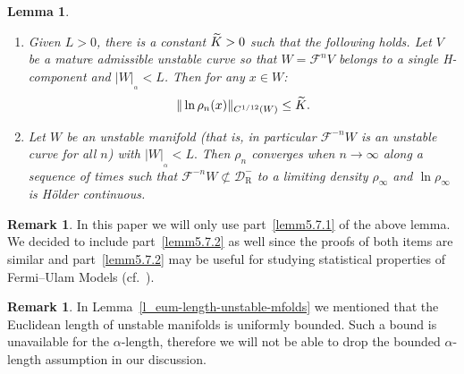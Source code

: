 \documentclass[10pt]{amsart}
\newtheorem{lemm}[theo]{Lemma}\newtheorem{prop}[theo]{Proposition}\newtheorem{coro}[theo]{Corollary}\newtheorem{conj}[theo]{Conjecture}
\theoremstyle{definition}\newtheorem{defi}[theo]{Definition}\newtheorem{rema}[theo]{Remark}\newtheorem{exam}[theo]{Example}\newtheorem{exem}[theo]{Example}\newtheorem{nota}[theo]{Notation}
\newcommand{\cm}{\mathcal{F}}
\newcommand{\cell}{\mathcal{D}}
\newcommand{\recoPrivate}{\mathrm{R}}
\newcommand{\reco}{{\cell^-_{\recoPrivate}}}
\newcommand{\adm}{_{\alpha^{+}}}
\newcommand{\admName}{\alpha^{+}}
\newcommand{\tK}{\tilde{K}}
\renewcommand{\admName}{\alpha}
\renewcommand{\adm}{_{\alpha}}
\newcommand*{\relabel}{\renewcommand{\labelenumi}{(\theenumi)}}
\newcommand*{\alphenumi}{\renewcommand*{\theenumi}{\alph{enumi}}\relabel}
\let\oldtilde\tilde
\renewcommand*{\tilde}[1]{\mathchoice{\widetilde{#1}}{\widetilde{#1}}{\oldtilde{#1}}{\oldtilde{#1}}}
\begin{document}
\begin{lemm}\label{LmBD}\leavevmode
\begin{enumerate}\alphenumi
\item\label{lemm5.7.1} Given $L > 0$, there is a constant $\tK > 0$ such that the following holds. Let $V$ be a mature admissible unstable curve so that $W = \cm^{n}V$ belongs to a single H-component and $|W|_{\adm} < L$. Then for any $x\in W$:
\begin{align*}
\|\ln \rho_n(x)\|_{C^{1/12}(W)}\leq \tK.
\end{align*}
\item\label{lemm5.7.2} Let $W$ be an unstable manifold (that is, in particular $\cm ^{-n}W$ is an unstable curve for all $n$) with $|W|_{\adm} < L.$ Then $\rho_n$ converges when $n\to\infty$ along a sequence of times such that $\cm^{-n} W\not\subset \reco$ to a limiting density $\rho_\infty$ and $\ln\rho_\infty$ is H\"older continuous.
\end{enumerate}
\end{lemm}


\begin{rema}
In this paper we will only use part~\eqref{lemm5.7.1} of the above lemma. We decided to include part~\eqref{lemm5.7.2} as well since the proofs of both items are similar and part~\eqref{lemm5.7.2} may be useful for studying statistical properties of Fermi--Ulam Models (cf.~\cite[\S7]{ChM}).
\end{rema}
\begin{rema}
In Lemma~\ref{l_eum-length-unstable-mfolds} we mentioned that the Euclidean length of unstable manifolds is uniformly bounded. Such a bound is unavailable for the $\admName$-length, therefore we will not be able to drop the bounded $\admName$-length assumption in our discussion.
\end{rema}
\end{document}
